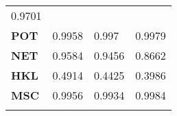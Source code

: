 \documentclass[]{article}
\begin{document}
\begin{longtable}[c]{@{}llll@{}}
\begin{minipage}[t]{0.09\columnwidth}
0.9701
\end{minipage}
\\\addlinespace
\begin{minipage}[t]{0.12\columnwidth}\raggedright
\textbf{POT}
\end{minipage} & \begin{minipage}[t]{0.09\columnwidth}\raggedright
0.9958
\end{minipage} & \begin{minipage}[t]{0.09\columnwidth}\raggedright
0.997
\end{minipage} & \begin{minipage}[t]{0.09\columnwidth}\raggedright
0.9979
\end{minipage}
\\\addlinespace
\begin{minipage}[t]{0.12\columnwidth}\raggedright
\textbf{NET}
\end{minipage} & \begin{minipage}[t]{0.09\columnwidth}\raggedright
0.9584
\end{minipage} & \begin{minipage}[t]{0.09\columnwidth}\raggedright
0.9456
\end{minipage} & \begin{minipage}[t]{0.09\columnwidth}\raggedright
0.8662
\end{minipage}
\\\addlinespace
\begin{minipage}[t]{0.12\columnwidth}\raggedright
\textbf{HKL}
\end{minipage} & \begin{minipage}[t]{0.09\columnwidth}\raggedright
0.4914
\end{minipage} & \begin{minipage}[t]{0.09\columnwidth}\raggedright
0.4425
\end{minipage} & \begin{minipage}[t]{0.09\columnwidth}\raggedright
0.3986
\end{minipage}
\\\addlinespace
\begin{minipage}[t]{0.12\columnwidth}\raggedright
\textbf{MSC}
\end{minipage} & \begin{minipage}[t]{0.09\columnwidth}\raggedright
0.9956
\end{minipage} & \begin{minipage}[t]{0.09\columnwidth}\raggedright
0.9934
\end{minipage} & \begin{minipage}[t]{0.09\columnwidth}\raggedright
0.9984
\end{minipage}
\\\addlinespace
\bottomrule
\end{longtable}
\end{document}
